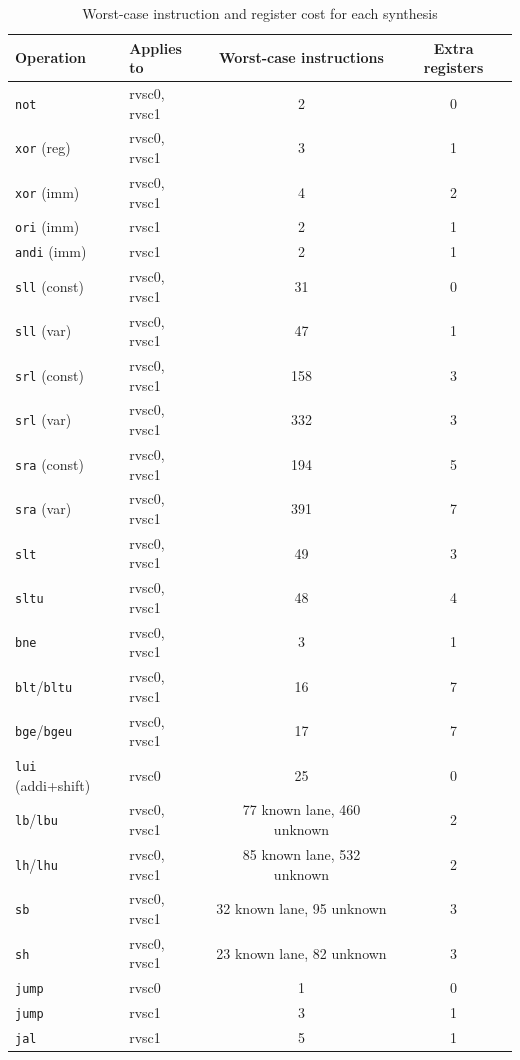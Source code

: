 \begin{table}[htb]
\centering
\caption{Worst-case instruction and register cost for each synthesis}
\label{tab:synthesis-cost}
\begin{tabular}{llcc}
\toprule
\textbf{Operation} & \textbf{Applies to} & \textbf{Worst-case instructions} & \textbf{Extra registers} \\
\midrule
\texttt{not}         & rvsc0, rvsc1 & 2    & 0 \\
\texttt{xor} (reg)   & rvsc0, rvsc1 & 3    & 1 \\
\texttt{xor} (imm)   & rvsc0, rvsc1 & 4    & 2 \\
\texttt{ori} (imm)   & rvsc1        & 2    & 1 \\
\texttt{andi} (imm)  & rvsc1        & 2    & 1 \\
\texttt{sll} (const) & rvsc0, rvsc1 & 31   & 0 \\
\texttt{sll} (var)   & rvsc0, rvsc1 & 47   & 1 \\
\texttt{srl} (const) & rvsc0, rvsc1 & 158  & 3 \\
\texttt{srl} (var)   & rvsc0, rvsc1 & 332  & 3 \\
\texttt{sra} (const) & rvsc0, rvsc1 & 194  & 5 \\
\texttt{sra} (var)   & rvsc0, rvsc1 & 391  & 7 \\
\texttt{slt}         & rvsc0, rvsc1 & 49   & 3 \\
\texttt{sltu}        & rvsc0, rvsc1 & 48   & 4 \\
\texttt{bne}         & rvsc0, rvsc1 & 3    & 1 \\
\texttt{blt}/\texttt{bltu} & rvsc0, rvsc1 & 16 & 7 \\
\texttt{bge}/\texttt{bgeu} & rvsc0, rvsc1 & 17 & 7 \\
\texttt{lui} (addi+shift) & rvsc0   & 25   & 0 \\
\texttt{lb}/\texttt{lbu} & rvsc0, rvsc1 & 77 known lane, 460 unknown & 2 \\
\texttt{lh}/\texttt{lhu} & rvsc0, rvsc1 & 85 known lane, 532 unknown & 2 \\
\texttt{sb}          & rvsc0, rvsc1 & 32 known lane, 95 unknown & 3 \\
\texttt{sh}          & rvsc0, rvsc1 & 23 known lane, 82 unknown & 3 \\
\texttt{jump}        & rvsc0        & 1    & 0 \\
\texttt{jump}        & rvsc1        & 3    & 1 \\
\texttt{jal}         & rvsc1        & 5    & 1 \\
\bottomrule
\end{tabular}
\end{table}

